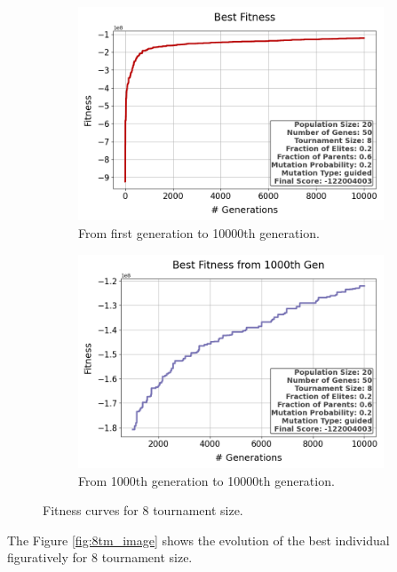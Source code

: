 \documentclass{assignment}
\begin{document}
\begin{figure}[H]
    \begin{subfigure}{0.5\textwidth}
        \includegraphics[width=\textwidth]{figures/best_fitness_output_20_50_8_0.2_0.6_0.2_guided.png}
        \caption{From first generation to 10000th generation.}
    \end{subfigure}\hfill
    \begin{subfigure}{0.5\textwidth}
        \includegraphics[width=\textwidth]{figures/best_fitness_1000_output_20_50_8_0.2_0.6_0.2_guided.png}
        \caption{From 1000th generation to 10000th generation.}
    \end{subfigure}
    \caption{Fitness curves for 8 tournament size.}
\label{fig:8tm}
\end{figure}

The Figure \ref{fig:8tm_image} shows the evolution of the best individual figuratively for 8 tournament size.
\end{document}
